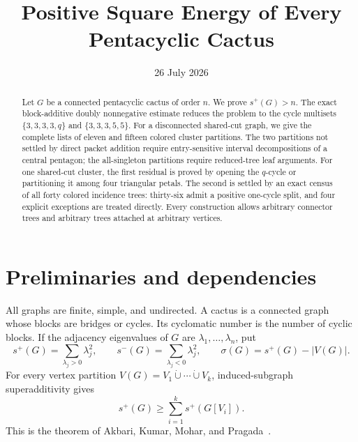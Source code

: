 \documentclass[11pt]{article}
\title{Positive Square Energy of Every Pentacyclic Cactus}
\author{}
\date{26 July 2026}
\newcommand{\spE}{s^+}
\newcommand{\smE}{s^-}
\newcommand{\sig}{\sigma}
\begin{document}
\maketitle

\begin{abstract}
Let $G$ be a connected pentacyclic cactus of order $n$.  We prove
$s^+(G)>n$.  The exact block-additive doubly nonnegative estimate reduces the
problem to the cycle multisets $\{3,3,3,3,q\}$ and $\{3,3,3,5,5\}$.
For a disconnected shared-cut graph, we give the complete lists of eleven and
fifteen colored cluster partitions.  The two partitions not settled by direct
packet addition require entry-sensitive interval decompositions of a central
pentagon; the all-singleton partitions require reduced-tree leaf arguments.
For one shared-cut cluster, the first residual is proved by opening the
$q$-cycle or partitioning it among four triangular petals.  The second is
settled by an exact census of all forty colored incidence trees: thirty-six
admit a positive one-cycle split, and four explicit exceptions are treated
directly.  Every construction allows arbitrary connector trees and arbitrary
trees attached at arbitrary vertices.
\end{abstract}

\section{Preliminaries and dependencies}

All graphs are finite, simple, and undirected.  A cactus is a connected graph
whose blocks are bridges or cycles.  Its cyclomatic number is the number of
cyclic blocks.  If the adjacency eigenvalues of $G$ are
$\lambda_1,\ldots,\lambda_n$, put
\[
 \spE(G)=\sum_{\lambda_j>0}\lambda_j^2,
 \qquad \smE(G)=\sum_{\lambda_j<0}\lambda_j^2,
 \qquad \sig(G)=\spE(G)-|V(G)|.
\]
For every vertex partition $V(G)=V_1\mathbin{\dot\cup}\cdots
\mathbin{\dot\cup}V_k$, induced-subgraph superadditivity gives
\begin{equation}\label{eq:super}
 \spE(G)\geq\sum_{i=1}^k\spE(G[V_i]).
\end{equation}
This is the theorem of Akbari, Kumar, Mohar, and Pragada~\cite{AKMP}.
\end{document}
